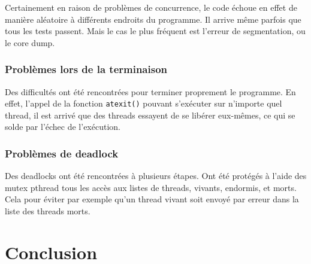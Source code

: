 \documentclass[a4paper,11pt]{article}
\begin{document}
Certainement en raison de problèmes de concurrence, le code échoue en effet de manière aléatoire à différents
endroits du programme.
Il arrive même parfois que tous les tests passent.
Mais le cas le plus fréquent est l'erreur de segmentation, ou le core dump.

\subsubsection{Problèmes lors de la terminaison}
Des difficultés ont été rencontrées pour terminer proprement le programme.
En effet, l'appel de la fonction \texttt{atexit()} pouvant s'exécuter sur n'importe quel thread,
il est arrivé que des threads essayent de se libérer eux-mêmes, ce qui se solde par l'échec de l'exécution.

\subsubsection{Problèmes de deadlock}
Des deadlocks ont été rencontrées à plusieurs étapes.
Ont été protégés à l'aide des mutex pthread tous les accès aux listes de threads, vivants, endormis, et morts.
Cela pour éviter par exemple qu'un thread vivant soit envoyé par erreur dans la liste des threads morts.

\subsubsection{}



\section*{Conclusion} %
\end{document}
